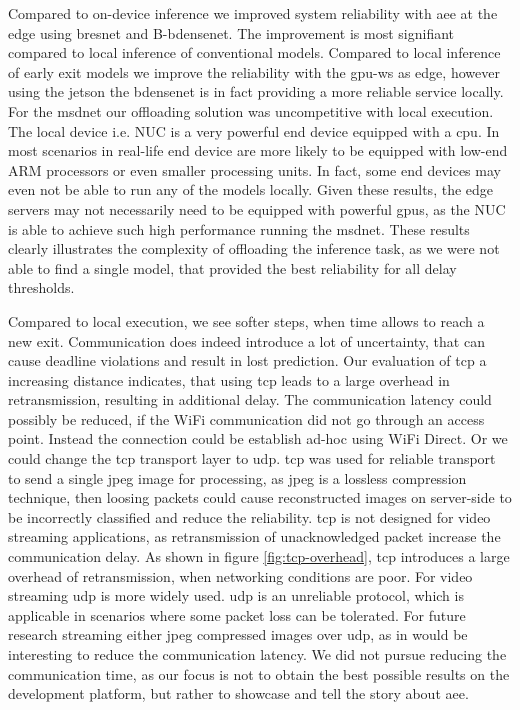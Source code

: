 Compared to on-device inference we improved system reliability with \gls{aee} at the edge using \gls{bresnet} and B-\gls{bdensenet}. The improvement is most signifiant compared to local inference of conventional models. Compared to local inference of early exit models we improve the reliability with the \gls{gpu-ws} as edge, however using the \gls{jetson} the \gls{bdensenet} is in fact providing a more reliable service locally. For the \gls{msdnet} our offloading solution was uncompetitive with local execution. The local device i.e. NUC is a very powerful end device equipped with a \gls{cpu}. In most scenarios in real-life end device are more likely to be equipped with low-end ARM processors or even smaller processing units. In fact, some end devices may even not be able to run any of the models locally. Given these results, the edge servers may not necessarily need to be equipped with powerful \gls{gpu}s, as the NUC is able to achieve such high performance running the \gls{msdnet}. These results clearly illustrates the complexity of offloading the inference task, as we were not able to find a single model, that provided the best reliability for all delay thresholds.

Compared to local execution, we see softer steps, when time allows to reach a new exit. Communication does indeed introduce a lot of uncertainty, that can cause deadline violations and result in lost prediction. Our evaluation of \gls{tcp} a increasing distance indicates, that using \gls{tcp} leads to a large overhead in retransmission, resulting in additional delay. The communication latency could possibly be reduced, if the WiFi communication did not go through an access point. Instead the connection could be establish ad-hoc using WiFi Direct. Or we could change the \gls{tcp} transport layer to \gls{udp}. \gls{tcp} was used for reliable transport to send a single jpeg image for processing, as jpeg is a lossless compression technique, then loosing packets could cause reconstructed images on server-side to be incorrectly classified and reduce the reliability. \gls{tcp} is not designed for video streaming applications, as retransmission of unacknowledged packet increase the communication delay. As shown in figure \ref{fig:tcp-overhead}, \gls{tcp} introduces a large overhead of retransmission, when networking conditions are poor. For video streaming \gls{udp} is more widely used. \gls{udp} is an unreliable protocol, which is applicable in scenarios where some packet loss can be tolerated. For future research streaming either jpeg compressed images over \gls{udp}, as in \cite{liu_maximizing_2019} would be interesting to reduce the communication latency. We did not pursue reducing the communication time, as our focus is not to obtain the best possible results on the development platform, but rather to showcase and tell the story about \gls{aee}.

